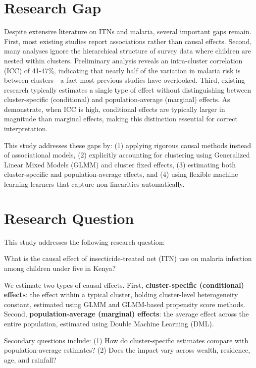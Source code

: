 \section{Research Gap}

Despite extensive literature on ITNs and malaria, several important gaps remain. First, most existing studies report associations rather than causal effects. Second, many analyses ignore the hierarchical structure of survey data where children are nested within clusters. Preliminary analysis reveals an intra-cluster correlation (ICC) of 41-47\%, indicating that nearly half of the variation in malaria risk is between clusters---a fact most previous studies have overlooked. Third, existing research typically estimates a single type of effect without distinguishing between cluster-specific (conditional) and population-average (marginal) effects. As \citet{neuhaus1991comparison} demonstrate, when ICC is high, conditional effects are typically larger in magnitude than marginal effects, making this distinction essential for correct interpretation.

This study addresses these gaps by: (1) applying rigorous causal methods instead of associational models, (2) explicitly accounting for clustering using Generalized Linear Mixed Models (GLMM) and cluster fixed effects, (3) estimating both cluster-specific and population-average effects, and (4) using flexible machine learning learners that capture non-linearities automatically.

\section{Research Question}

This study addresses the following research question:

\begin{pro}
	What is the causal effect of insecticide-treated net (ITN) use on malaria infection among children under five in Kenya?
\end{pro}

We estimate two types of causal effects. First, \textbf{cluster-specific (conditional) effects}: the effect within a typical cluster, holding cluster-level heterogeneity constant, estimated using GLMM and GLMM-based propensity score methods. Second, \textbf{population-average (marginal) effects}: the average effect across the entire population, estimated using Double Machine Learning (DML).

Secondary questions include: (1) How do cluster-specific estimates compare with population-average estimates? (2) Does the impact vary across wealth, residence, age, and rainfall?

